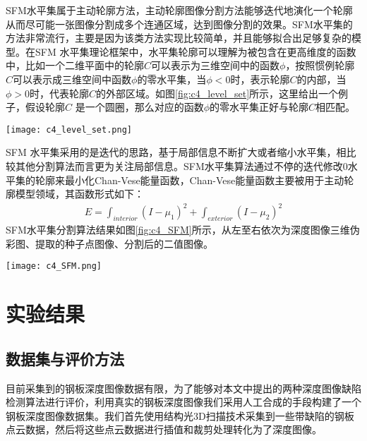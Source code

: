     SFM水平集属于主动轮廓方法，主动轮廓图像分割方法能够迭代地演化一个轮廓从而尽可能一张图像分割成多个连通区域，达到图像分割的效果。SFM水平集的方法非常流行，主要是因为该类方法实现比较简单，并且能够拟合出足够复杂的模型。在SFM 水平集理论框架中，水平集轮廓可以理解为被包含在更高维度的函数中，比如一个二维平面中的轮廓$C$可以表示为三维空间中的函数$\phi$，按照惯例轮廓$C$可以表示成三维空间中函数$\phi$的零水平集，当$\phi<0$时，表示轮廓$C$的内部，当$\phi>0$时，代表轮廓$C$的外部区域。如图\ref{fig:c4_level_set}所示，这里给出一个例子，假设轮廓$C$ 是一个圆圈，那么对应的函数$\phi$的零水平集正好与轮廓$C$相匹配。

    \begin{figure*}[!h]
    \centering
    \texttt{[image: c4\_level\_set.png]}
    \caption{SFM水平集理论示意图}
    \label{fig:c4_level_set}
    \end{figure*}

    SFM 水平集采用的是迭代的思路，基于局部信息不断扩大或者缩小水平集，相比较其他分割算法而言更为关注局部信息。SFM水平集算法通过不停的迭代修改0水平集的轮廓来最小化Chan-Vese能量函数\cite{Chan2001Active}，Chan-Vese能量函数主要被用于主动轮廓模型领域，其函数形式如下：
    \begin{eqnarray}
    E=\int_{interior}\left({I-\mu_1}\right)^{2}+\int_{exterior}\left({I-\mu_2}\right)^{2}
    \end{eqnarray}
    SFM水平集分割算法结果如图\ref{fig:c4_SFM}所示，从左至右依次为深度图像三维伪彩图、提取的种子点图像、分割后的二值图像。

    \begin{figure*}[!h]
    \centering
    \texttt{[image: c4\_SFM.png]}
    \caption{SFM水平集分割算法效果图}
    \label{fig:c4_SFM}
    \end{figure*}

    \section{实验结果}
        \subsection{数据集与评价方法}
        目前采集到的钢板深度图像数据有限，为了能够对本文中提出的两种深度图像缺陷检测算法进行评价，利用真实的钢板深度图像我们采用人工合成的手段构建了一个钢板深度图像数据集。我们首先使用结构光3D扫描技术采集到一些带缺陷的钢板点云数据，然后将这些点云数据进行插值和裁剪处理转化为了深度图像。

